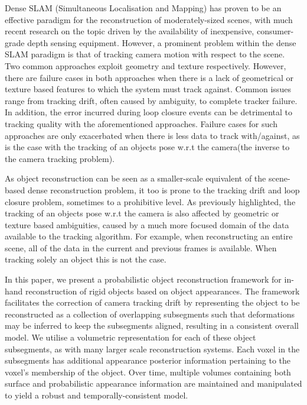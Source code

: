 Dense SLAM (Simultaneous Localisation and Mapping) has proven to be an effective paradigm for the reconstruction of moderately-sized scenes,
with much recent research on the topic driven by the availability of inexpensive, consumer-grade depth sensing equipment\cite{Newcombe2011,Niessner2013,Prisacariu2014}. 
However, a prominent problem within the dense SLAM paradigm is that of tracking camera motion with respect to the scene. Two common approaches exploit geometry and texture 
respectively. However, there are failure cases in both approaches when there is a lack of geometrical or texture based features to which the system must track against. 
Common issues range from tracking drift, often caused by ambiguity, to complete tracker failure. In addition, the error incurred during loop closure events can be detrimental 
to tracking quality with the aforementioned approaches. Failure cases for such approaches are only exacerbated when there is 
less data to track with/against, as is the case with the tracking of an objects pose w.r.t the camera(the inverse to the camera tracking problem).

As object reconstruction can be seen as a smaller-scale equivalent of the scene-based dense reconstruction problem, it too is prone to the
tracking drift and loop closure problem, sometimes to a prohibitive level. As previously highlighted, the tracking of an objects pose w.r.t the camera is also affected 
by geometric or texture based ambiguities, caused by a much more focused domain of the data available to the tracking algorithm. For example, when reconstructing an 
entire scene, all of the data in the current and previous frames is available. When tracking solely an object this is not the case.

In this paper, we present a probabilistic object reconstruction framework for in-hand reconstruction of rigid objects based on object
appearances. The framework facilitates the correction of camera tracking drift by representing the object to be reconstructed as a
collection of overlapping subsegments such that deformations may be inferred to keep the subsegments aligned, resulting in a consistent
overall model. We utilise a volumetric representation for each of these object subsegments, as with many larger scale reconstruction
systems\cite{Kahler2016}. Each voxel in the subsegments has additional appearance posterior information pertaining to the voxel's membership of the object.
Over time, multiple volumes containing both surface and probabilistic appearance information are maintained and manipulated to yield a
robust and temporally-consistent model.

